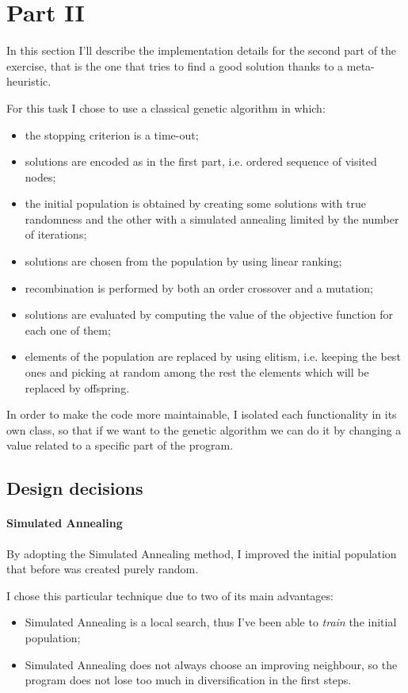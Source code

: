 \section{Part II}

In this section I'll describe the implementation details for the second part of
the exercise, that is the one that tries to find a good solution thanks to a
meta-heuristic.

For this task I chose to use a classical genetic algorithm in which:

\begin{itemize}
	\item the stopping criterion is a time-out;
	\item solutions are encoded as in the first part, i.e. ordered sequence of
		visited nodes;
	\item the initial population is obtained by creating some solutions with true
		randomness and the other with a simulated annealing limited by the number
		of iterations;
	\item solutions are chosen from the population by using linear ranking;
	\item recombination is performed by both an order crossover and a mutation;
	\item solutions are evaluated by computing the value of the objective
		function for each one of them;
	\item elements of the population are replaced by using elitism, i.e. keeping
		the best ones and picking at random among the rest the elements which will
		be replaced by offspring.
\end{itemize}

In order to make the code more maintainable, I isolated each functionality in
its own class, so that if we want to  the genetic algorithm we can
do it by changing a value related to a specific part of the program.

\subsection{Design decisions}

\paragraph{Simulated Annealing} By adopting the Simulated Annealing method, I
improved the initial population that before was created purely random.

I chose this particular technique due to two of its main advantages:
\begin{itemize}
	\item Simulated Annealing is a local search, thus I've been able to
		\textit{train} the initial population;
	\item Simulated Annealing does not always choose an improving neighbour, so
	  the program does not lose too much in diversification in the first steps.
\end{itemize}

